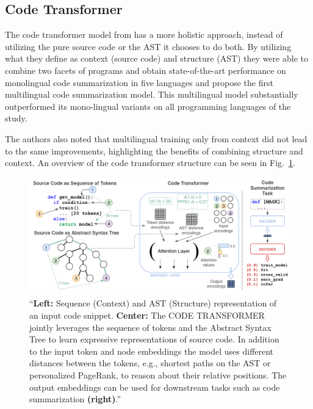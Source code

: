 \subsection{Code Transformer}

The code transformer model from \citet{code_transformer} has a more holistic approach, instead of utilizing the pure source code or the AST it chooses to do both. By utilizing what they define as context (source code) and structure (AST) they were able to combine two facets of programs and obtain state-of-the-art performance on monolingual code summarization in five languages and propose the first multilingual code summarization model.
This multilingual model substantially outperformed its mono-lingual variants on all programming languages of the study. 

The authors also noted that multilingual training only from context did not lead to the same improvements, highlighting the benefits of combining structure and context.
An overview of the code transformer structure can be seen in Fig.~\ref{fig:codetransf}.

\begin{figure}[!ht]
\centerline{\includegraphics[width=\textwidth]{figuras/code-transformer.png}}
\caption{``\textbf{Left:} Sequence (Context) and AST (Structure) representation of an input code snippet. \textbf{Center:} The CODE TRANSFORMER jointly leverages the sequence of tokens and the Abstract Syntax Tree to learn expressive representations of source code. In addition to the input token and node embeddings the model uses different distances between the tokens, e.g., shortest paths on the AST or personalized PageRank, to reason about their relative positions. The output embeddings can be used for downstream tasks such as code summarization \textbf{(right)}.'' \citep{code_transformer}}
\label{fig:codetransf}
\end{figure}







